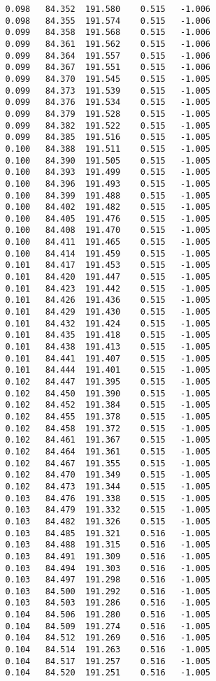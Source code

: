 \begin{verbatim}
   0.098   84.352  191.580    0.515   -1.006
   0.098   84.355  191.574    0.515   -1.006
   0.099   84.358  191.568    0.515   -1.006
   0.099   84.361  191.562    0.515   -1.006
   0.099   84.364  191.557    0.515   -1.006
   0.099   84.367  191.551    0.515   -1.006
   0.099   84.370  191.545    0.515   -1.005
   0.099   84.373  191.539    0.515   -1.005
   0.099   84.376  191.534    0.515   -1.005
   0.099   84.379  191.528    0.515   -1.005
   0.099   84.382  191.522    0.515   -1.005
   0.099   84.385  191.516    0.515   -1.005
   0.100   84.388  191.511    0.515   -1.005
   0.100   84.390  191.505    0.515   -1.005
   0.100   84.393  191.499    0.515   -1.005
   0.100   84.396  191.493    0.515   -1.005
   0.100   84.399  191.488    0.515   -1.005
   0.100   84.402  191.482    0.515   -1.005
   0.100   84.405  191.476    0.515   -1.005
   0.100   84.408  191.470    0.515   -1.005
   0.100   84.411  191.465    0.515   -1.005
   0.100   84.414  191.459    0.515   -1.005
   0.101   84.417  191.453    0.515   -1.005
   0.101   84.420  191.447    0.515   -1.005
   0.101   84.423  191.442    0.515   -1.005
   0.101   84.426  191.436    0.515   -1.005
   0.101   84.429  191.430    0.515   -1.005
   0.101   84.432  191.424    0.515   -1.005
   0.101   84.435  191.418    0.515   -1.005
   0.101   84.438  191.413    0.515   -1.005
   0.101   84.441  191.407    0.515   -1.005
   0.101   84.444  191.401    0.515   -1.005
   0.102   84.447  191.395    0.515   -1.005
   0.102   84.450  191.390    0.515   -1.005
   0.102   84.452  191.384    0.515   -1.005
   0.102   84.455  191.378    0.515   -1.005
   0.102   84.458  191.372    0.515   -1.005
   0.102   84.461  191.367    0.515   -1.005
   0.102   84.464  191.361    0.515   -1.005
   0.102   84.467  191.355    0.515   -1.005
   0.102   84.470  191.349    0.515   -1.005
   0.102   84.473  191.344    0.515   -1.005
   0.103   84.476  191.338    0.515   -1.005
   0.103   84.479  191.332    0.515   -1.005
   0.103   84.482  191.326    0.515   -1.005
   0.103   84.485  191.321    0.516   -1.005
   0.103   84.488  191.315    0.516   -1.005
   0.103   84.491  191.309    0.516   -1.005
   0.103   84.494  191.303    0.516   -1.005
   0.103   84.497  191.298    0.516   -1.005
   0.103   84.500  191.292    0.516   -1.005
   0.103   84.503  191.286    0.516   -1.005
   0.104   84.506  191.280    0.516   -1.005
   0.104   84.509  191.274    0.516   -1.005
   0.104   84.512  191.269    0.516   -1.005
   0.104   84.514  191.263    0.516   -1.005
   0.104   84.517  191.257    0.516   -1.005
   0.104   84.520  191.251    0.516   -1.005

\end{verbatim}
